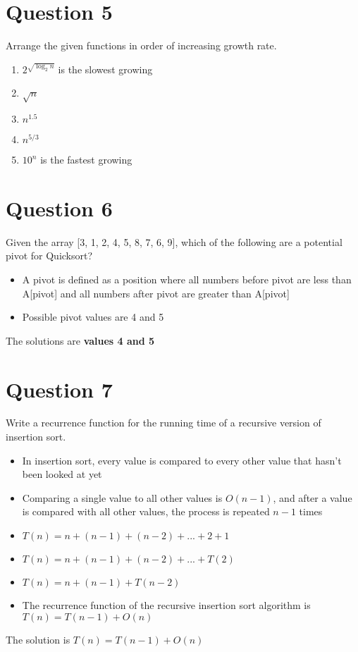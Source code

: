 \documentclass{report}
\begin{document}
    \section{Question 5}
    Arrange the given functions in order of increasing growth rate.
        \begin{enumerate}
            \item{$2^{\sqrt{\log_2 n}}$ is the slowest growing}
            \item{$\sqrt n$}
            \item{$n^{1.5}$}
            \item{$n^{5/3}$}
            \item{$10^n$ is the fastest growing}
        \end{enumerate}

    \section{Question 6}
    Given the array [3, 1, 2, 4, 5, 8, 7, 6, 9], which of the following are a potential pivot for Quicksort?
        \begin{itemize}
            \item{A pivot is defined as a position where all numbers before pivot are less than A[pivot] and all numbers after pivot are greater than A[pivot]}
            \item{Possible pivot values are 4 and 5}
        \end{itemize}
        The solutions are \textbf{values 4 and 5}

    \section{Question 7}
    Write a recurrence function for the running time of a recursive version of insertion sort.
    	\begin{itemize}
    		\item{In insertion sort, every value is compared to every other value that hasn't been looked at yet}
    		\item{Comparing a single value to all other values is $O(n - 1)$, and after a value is compared with all other values, the process is repeated $n-1$ times}
    		\item{$T(n) = n + (n - 1) + (n - 2) + ... + 2 + 1$}
    		\item{$T(n) = n + (n - 1) + (n-2) + ... + T(2)$}
    		\item{$T(n) = n + (n - 1) + T(n-2)$}
    		\item{The recurrence function of the recursive insertion sort algorithm is $T(n) = T(n-1) + O(n)$}
		\end{itemize}
        The solution is $T(n) = T(n-1) + O(n)$
\end{document}

